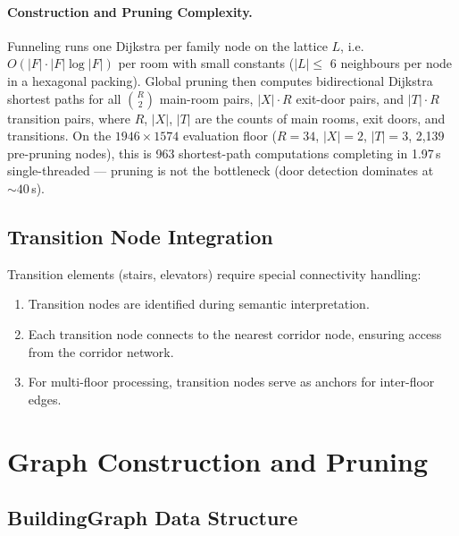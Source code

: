 \documentclass[manuscript,screen,review]{acmart}
\begin{document}
\paragraph{Construction and Pruning Complexity.}
Funneling runs one Dijkstra per family node on the lattice $L$, i.e. $O(|F| \cdot |F| \log |F|)$ per room with small constants ($|L| \le$ 6 neighbours per node in a hexagonal packing). Global pruning then computes bidirectional Dijkstra shortest paths for all $\binom{R}{2}$ main-room pairs, $|X| \cdot R$ exit-door pairs, and $|T| \cdot R$ transition pairs, where $R$, $|X|$, $|T|$ are the counts of main rooms, exit doors, and transitions. On the $1946 \times 1574$ evaluation floor ($R = 34$, $|X| = 2$, $|T| = 3$, 2{,}139 pre-pruning nodes), this is 963 shortest-path computations completing in 1.97\,s single-threaded --- pruning is not the bottleneck (door detection dominates at ${\sim}40$\,s).

\subsection{Transition Node Integration}
\label{subsec:transitions}

Transition elements (stairs, elevators) require special connectivity handling:

\begin{enumerate}
    \item Transition nodes are identified during semantic interpretation.
    \item Each transition node connects to the nearest corridor node, ensuring access from the corridor network.
    \item For multi-floor processing, transition nodes serve as anchors for inter-floor edges.
\end{enumerate}

\section{Graph Construction and Pruning}
\label{sec:graph}

\subsection{BuildingGraph Data Structure}
\label{subsec:buildinggraph}
\end{document}
